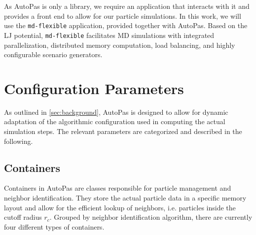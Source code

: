 
As AutoPas is only a library, we require an application that interacts with it and provides a front end to allow for our particle simulations. In this work, we will use the \texttt{md-flexible} application, provided together with AutoPas. Based on the LJ potential, \texttt{md-flexible} facilitates MD simulations with integrated parallelization, distributed memory computation, load balancing, and highly configurable scenario generators.


\section{Configuration Parameters}
\label{sec:config_params}

As outlined in \autoref{sec:background}, AutoPas is designed to allow for dynamic adaptation of the algorithmic configuration used in computing the actual simulation steps. The relevant parameters are categorized and described in the following.

\subsection{Containers}

Containers in AutoPas are classes responsible for particle management and neighbor identification. They store the actual particle data in a specific memory layout and allow for the efficient lookup of neighbors, i.e. particles inside the cutoff radius $r_c$. Grouped by neighbor identification algorithm, there are currently four different types of containers.

